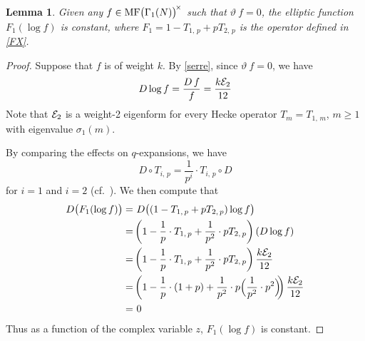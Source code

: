 \documentclass{gtpart}
\newtheorem{lem}[thm]{Lemma}
\theoremstyle{definition}
\theoremstyle{remark}
\newcommand{\CE}{{\cal E}}
\newcommand{\MF}{{\rm MF}}
\newcommand{\G}{\Gamma}
\newcommand{\si}{\sigma}
\renewcommand{\=}{\approx}
\renewcommand{\-}{\sim}
\numberwithin{equation}{section}
\numberwithin{thm}{section}
\begin{document}
\begin{lem}
 \label{lem:const}
 Given any $f \in \MF\big(\G_1(N)\big)^{\!\times}$ such that $\vartheta ~\! f = 0$, the elliptic function $F_1(\log f)$ is constant, 
 where $F_1 = 1 - T_{1,\,p} + p T_{2,\,p}$ is the operator defined in \eqref{FX}.  
\end{lem}
\begin{proof}
 Suppose that $f$ is of weight $k$.  
 By \eqref{serre}, since $\vartheta ~\! f = 0$, we have 
 \[
  D \log f = \frac{D ~\! f}{f} = \frac{k \CE_2}{12} 
 \]
 Note that $\CE_2$ is a weight-2 eigenform for every Hecke operator $T_m = T_{1,\,m}$, $m \geq 1$ with eigenvalue $\si_1(m)$.  

 By comparing the effects on $q$-expansions, we have 
 \begin{equation}
  \label{DT}
  D \circ T_{i,\,p} = \frac{1}{p^i} \cdot T_{i,\,p} \circ D 
 \end{equation}
 for $i = 1$ and $i = 2$ (cf.~\cite[Remarque after Th\'eor\`em 5]{fmpadiq}).  
 We then compute that 
 \begin{equation*}
  \begin{split}
   D \big( F_1(\log f) \big) = & ~ D \big( (1 - T_{1,\,p} + p T_{2,\,p}) \log f \big) \\
                             = & \left( 1 - \frac{1}{p} \cdot T_{1,\,p} + \frac{1}{p^2} \cdot p T_{2,\,p} \right) (D \log f) \\
                             = & \left( 1 - \frac{1}{p} \cdot T_{1,\,p} + \frac{1}{p^2} \cdot p T_{2,\,p} \right) \frac{k \CE_2}{12} \\
                             = & \left( 1 - \frac{1}{p} \cdot (1 + p) + \frac{1}{p^2} \cdot p \Big( \frac{1}{p^2} \cdot p^2 \Big) \!\! \right) \frac{k \CE_2}{12} \\
                             = & ~ 0 
  \end{split}
 \end{equation*}
 Thus as a function of the complex variable $z$, $F_1(\log f)$ is constant.  
\end{proof}
\end{document}
